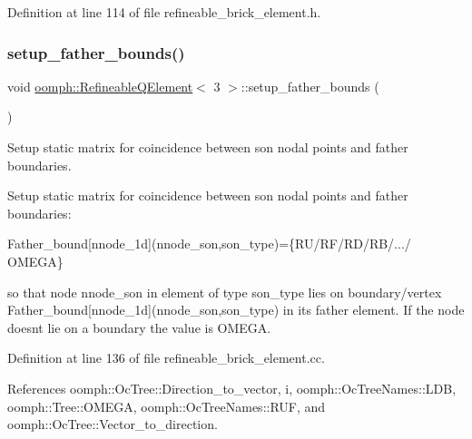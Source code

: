 Definition at line 114 of file refineable\+\_\+brick\+\_\+element.\+h.

\mbox{\label{classoomph_1_1RefineableQElement_3_013_01_4_a8e9be85046f3898ece0a328512392ca8}} 
\subsubsection{\texorpdfstring{setup\+\_\+father\+\_\+bounds()}{setup\_father\_bounds()}}
{\footnotesize\ttfamily void \hyperlink{classoomph_1_1RefineableQElement}{oomph\+::\+Refineable\+Q\+Element}$<$ 3 $>$\+::setup\+\_\+father\+\_\+bounds (\begin{DoxyParamCaption}{ }\end{DoxyParamCaption})\hspace{0.3cm}{\ttfamily [protected]}}



Setup static matrix for coincidence between son nodal points and father boundaries. 

Setup static matrix for coincidence between son nodal points and father boundaries\+:

Father\+\_\+bound\mbox{[}nnode\+\_\+1d\mbox{]}(nnode\+\_\+son,son\+\_\+type)=\{R\+U/\+R\+F/\+R\+D/\+R\+B/.../ O\+M\+E\+GA\}

so that node nnode\+\_\+son in element of type son\+\_\+type lies on boundary/vertex Father\+\_\+bound\mbox{[}nnode\+\_\+1d\mbox{]}(nnode\+\_\+son,son\+\_\+type) in its father element. If the node doesn\textquotesingle{}t lie on a boundary the value is O\+M\+E\+GA. 

Definition at line 136 of file refineable\+\_\+brick\+\_\+element.\+cc.



References oomph\+::\+Oc\+Tree\+::\+Direction\+\_\+to\+\_\+vector, i, oomph\+::\+Oc\+Tree\+Names\+::\+L\+DB, oomph\+::\+Tree\+::\+O\+M\+E\+GA, oomph\+::\+Oc\+Tree\+Names\+::\+R\+UF, and oomph\+::\+Oc\+Tree\+::\+Vector\+\_\+to\+\_\+direction.

\mbox{\label{classoomph_1_1RefineableQElement_3_013_01_4_a3d38b1cfacb055140a330e3d251b601f}} 
